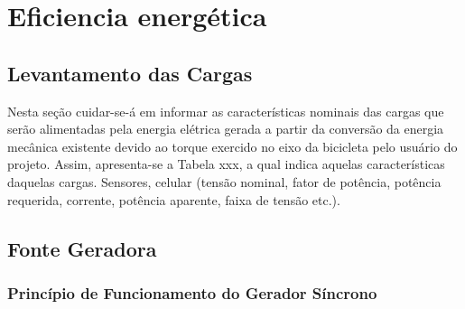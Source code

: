 \section{Eficiencia energética}

\subsection{Levantamento das Cargas}
\label{levantamento-cargas}

Nesta seção cuidar-se-á em informar as características nominais das cargas que serão alimentadas pela energia elétrica gerada a partir da conversão da energia mecânica existente devido ao torque exercido no eixo da bicicleta pelo usuário do projeto. Assim, apresenta-se a Tabela xxx, a qual indica aquelas características daquelas cargas.
Sensores, celular (tensão nominal, fator de potência, potência requerida, corrente, potência aparente, faixa de tensão etc.).

\subsection{Fonte Geradora}
\label{fonte-geradora}

\subsubsection{Princípio de Funcionamento do Gerador Síncrono}
\label{gerador-sincrono}


